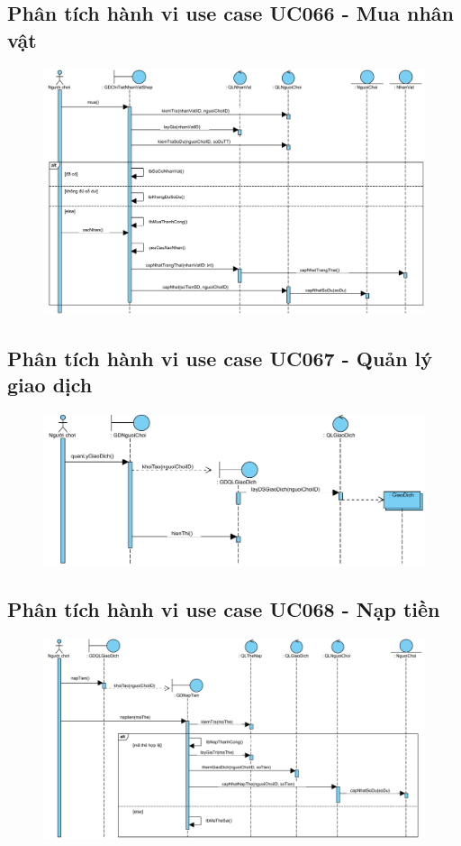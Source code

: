 \documentclass[3p]{elsarticle}
\begin{document}
\subsection{Phân tích hành vi use case UC066 - Mua nhân vật}
\begin{figure}[!htbp]
	\hspace*{-.5in}
	\centering
	\includegraphics[scale=.55]{images/sequence-pdfs/gamer/ShopManagement_BuyCharacter.pdf}
\end{figure}
\newpage

\subsection{Phân tích hành vi use case UC067 - Quản lý giao dịch}
\begin{figure}[!htbp]
	\hspace*{-.5in}
	\centering
	\includegraphics[scale=.55]{images/sequence-pdfs/gamer/TransactionManagement.pdf}
\end{figure}

\subsection{Phân tích hành vi use case UC068 - Nạp tiền}
\begin{figure}[!htbp]
	\hspace*{-.5in}
	\centering
	\includegraphics[scale=.55]{images/sequence-pdfs/gamer/TransactionManagement_Recharge.pdf}
\end{figure}
\end{document}
